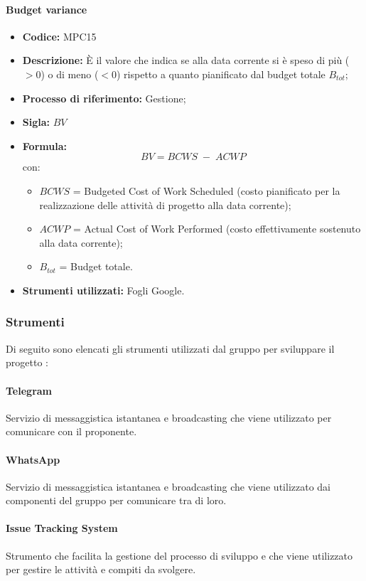\paragraph{Budget variance}
\begin{itemize}
	\item \textbf{Codice:} MPC15
	\item \textbf{Descrizione:} È il valore che indica se alla data corrente si è speso di più ($>0$) o di meno ($<0$) rispetto a quanto pianificato dal budget totale $B_{tot}$;
	\item \textbf{Processo di riferimento:} Gestione;
	\item \textbf{Sigla:} $BV$
	\item \textbf{Formula:} $$BV = {BCWS \; - \; ACWP}$$
	con:
	\begin{itemize}
		\item $BCWS$ = Budgeted Cost of Work Scheduled (costo pianificato per la realizzazione delle attività di progetto alla data corrente);
		\item $ACWP$ = Actual Cost of Work Performed (costo effettivamente sostenuto alla data corrente);
		\item $B_{tot}$ = Budget totale.
	\end{itemize}
	\item \textbf{Strumenti utilizzati:} Fogli Google.
\end{itemize}

\subsubsection{Strumenti}
Di seguito sono elencati gli strumenti utilizzati dal gruppo per sviluppare il progetto \glo{\NomeProgetto{}}:

\paragraph{Telegram} 
Servizio di messaggistica istantanea e broadcasting che viene utilizzato per comunicare con il proponente.
\paragraph{WhatsApp} 
Servizio di messaggistica istantanea e broadcasting che viene utilizzato dai componenti del gruppo per comunicare tra di loro.
\paragraph{Issue Tracking System} 
Strumento che facilita la gestione del processo di sviluppo e che viene utilizzato per gestire le attività e compiti da svolgere.
